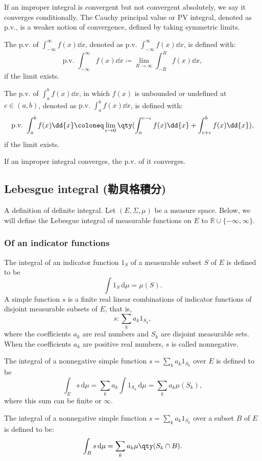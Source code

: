 \documentclass[a4paper,12pt]{report}
\begin{document}
\begin{itemize}
\begin{itemize}
If an improper integral is convergent but not convergent absolutely, we say it converges conditionally.
The Cauchy principal value or PV integral, denoted as p.v., is a weaker notion of convergence, defined by taking symmetric limits. 

The p.v. of $\int _{-\infty}^{\infty}f(x)\dd{x}$, denoted as $\text{p.v.\ }\int_{-\infty}^{\infty} f(x)\dd{x}$, is defined with:
\[\text{p.v.\ }\int_{-\infty}^{\infty} f(x)\dd{x}\coloneq\lim_{R\to\infty} \int_{-R}^{R} f(x)\dd{x},\]
if the limit exists.

The p.v. of $\int _{a}^{b}f(x)\dd{x}$, in which $f(x)$ is unbounded or undefined at $c\in (a,b)$, denoted as $\text{p.v.\ }\int_{a}^{b} f(x)\dd{x}$, is defined with:
\[\text{p.v.\ }\int_{a}^{b} f(x)\dd{x}\coloneq\lim_{\epsilon\to 0}\qty(\int_a^{c-\epsilon}f(x)\dd{x}+\int_{c+\epsilon}^bf(x)\dd{x}),\]
if the limit exists.

If an improper integral converges, the p.v. of it converges.
\subsection{Lebesgue integral (勒貝格積分)}
A definition of definite integral.
Let $(E,\Sigma,\mu)$ be a measure space. Below, we will define the Lebesgue integral of measurable functions on $E$ to $\mathbb{R}\cup\{-\infty,\infty\}$.
\subsubsection{Of an indicator functions}
The integral of an indicator function $1_S$ of a measurable subset $S$ of $E$ is defined to be
\[\int 1_{S}\,\mathrm{d}{\mu} =\mu (S).\]
A simple function $s$ is a finite real linear combinations of indicator functions of disjoint measurable subsets of $E$, that is,
\[s\colon\sum_ka_k1_{S_k},\]
where the coefficients $a_k$ are real numbers and $S_k$ are disjoint measurable sets. When the coefficients $a_k$ are positive real numbers, $s$ is called nonnegative.

The integral of a nonnegative simple function $s=\sum_ka_k1_{S_k}$ over $E$ is defined to be
\[\int_Es\,\mathrm{d}\mu=\sum_ka_k\int 1_{S_k}\,\mathrm{d}\mu=\sum_ka_k\mu(S_k),\]
where this sum can be finite or $\infty$.

The integral of a nonnegative simple function $s=\sum_ka_k1_{S_k}$ over a subset $B$ of $E$ is defined to be:
\[\int_Bs\,\mathrm{d}\mu=\sum_ka_k\mu \qty(S_k\cap B).\]

\end{itemize}
\end{itemize}
\end{document}
